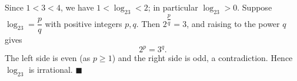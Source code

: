 Since $1<3<4$, we have $1<\log_23<2$; in particular $\log_23>0$. Suppose $\log_23=\dfrac pq$ with positive integers $p,q$. Then $2^{\dfrac pq}=3$, and raising to the power $q$ gives
\[2^p=3^q.\]
The left side is even (as $p\ge1$) and the right side is odd, a contradiction. Hence $\log_23$ is irrational. $\blacksquare$
